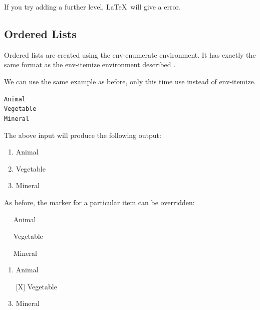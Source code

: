 If you try adding a further level, \LaTeX\ will give a  error.


\subsection{Ordered Lists}
\label{sec:enumerate}

Ordered lists are created using the \gls{env-enumerate} 
environment.
It has exactly the same format as the \gls{env-itemize} environment
described .

We can use the same example as before, only this time use
 instead of \gls{env-itemize}.

\begin{code}
\begin{alltt}
   Animal
   Vegetable
   Mineral
\end{alltt}
\end{code}%
The above input will produce the following output:
\begin{result}
\begin{enumerate}
\item Animal
\item Vegetable
\item Mineral
\end{enumerate}
\end{result}

As before, the marker for a particular item can be overridden:
\begin{code}
\newline
\strut~~ Animal\newline
\strut~~ Vegetable\newline
\strut~~ Mineral\newline
{}
\end{code}%
\begin{result}
\begin{enumerate}
\item Animal
\item[{[X]}] Vegetable
\item Mineral
\end{enumerate}
\end{result}

